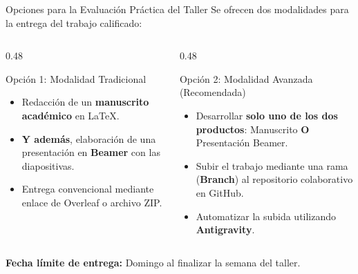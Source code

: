 \documentclass[aspectratio=169, 10pt]{beamer}
\begin{document}
\begin{frame}{Opciones para la Evaluación Práctica del Taller}
  {\small Se ofrecen dos modalidades para la entrega del trabajo calificado:}

  \vspace{0.1cm}
  \begin{columns}[T]
    \begin{column}{0.48\textwidth}
      \begin{block}{Opción 1: Modalidad Tradicional}
        \small
        \begin{itemize}
          \item Redacción de un \textbf{manuscrito académico} en \LaTeX.
          \item \textbf{Y además}, elaboración de una presentación en \textbf{Beamer} con las diapositivas.
          \item Entrega convencional mediante enlace de Overleaf o archivo ZIP.
        \end{itemize}
      \end{block}
    \end{column}

    \begin{column}{0.48\textwidth}
      \begin{exampleblock}{Opción 2: Modalidad Avanzada (Recomendada)}
        \small
        \begin{itemize}
          \item Desarrollar \textbf{solo uno de los dos productos}: Manuscrito \textbf{O} Presentación Beamer.
          \item Subir el trabajo mediante una rama (\textbf{Branch}) al repositorio colaborativo en GitHub.
          \item Automatizar la subida utilizando \textbf{Antigravity}.
        \end{itemize}
      \end{exampleblock}
    \end{column}
  \end{columns}

  \vspace{0.15cm}
  \begin{center}
    \footnotesize\textbf{Fecha límite de entrega:} Domingo al finalizar la semana del taller.
  \end{center}
\end{frame}
\end{document}
